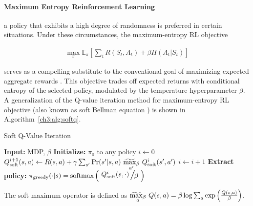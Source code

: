 \paragraph{Maximum Entropy Reinforcement Learning} a policy that exhibits a high degree of randomness is preferred in certain situations. Under these circumstances, the maximum-entropy RL objective

\begin{align}
    \max_{\pi} \mathbb{E}_{\pi} \left[ \sum_{t} R(S_t, A_t) + \beta H(A_t | S_t) \right] \label{ch3:eq:maxentrl}
\end{align}

serves as a compelling substitute to the conventional goal of maximizing expected aggregate rewards \cite{ziebart2008maximum}. This objective trades off expected returns with conditional entropy of the selected policy, modulated by the temperature hyperparameter $\beta$. A generalization of the Q-value iteration method for maximum-entropy RL objective (also known as soft Bellman equation \cite{sutton2018reinforcement}) is shown in Algorithm~\ref{ch3:alg:softq}.

\begin{algorithm}
\caption{Soft Q-Value Iteration}\label{ch3:alg:softq}
\begin{algorithmic}[1]
\State \textbf{Input:} MDP, $\beta$
\State \textbf{Initialize:} $\pi_0$ to any policy
\State $i \gets 0$
\Repeat
    \State $Q^{i+1}_{\text{soft}}(s,a) \gets R(s,a) + \gamma \sum_{s'} \text{Pr}(s'|s,a) \ \stackMath\stackunder[0.1pt]{\widetilde{\max}_\beta}{_{a'}} \ Q^{i}_{\text{soft}}(s',a')$
    \State $i \gets i + 1$
\State \textbf{Extract policy:} $\pi_{\text{greedy}}(\cdot |s) = \text{softmax}\left(\altfrac{Q^{i}_{\text{soft}}(s,\cdot)}{\beta}\right)$
\end{algorithmic}
\end{algorithm}


The soft maximum operator is defined as $\stackMath\stackunder[0.1pt]{\widetilde{\max}_\beta}{_a} \ Q(s,a) = \beta\log\sum_a \exp \left( \frac{Q(s,a)}{\beta} \right)$.

